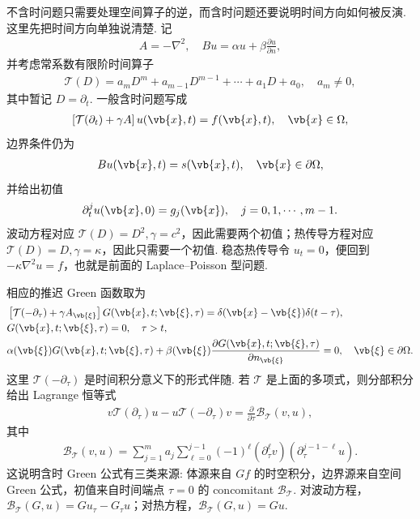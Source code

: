 不含时问题只需要处理空间算子的逆，而含时问题还要说明时间方向如何被反演. 这里先把时间方向单独说清楚. 记
\begin{align*}
	A=-\nabla^2,
	\quad
	B u=\alpha u+\beta\frac{\partial u}{\partial n},
\end{align*}
并考虑常系数有限阶时间算子
\begin{align*}
	\mathcal{T}(D)=a_mD^m+a_{m-1}D^{m-1}+\cdots+a_1D+a_0,
	\quad a_m\neq0,
\end{align*}
其中暂记 $D=\partial_t$. 一般含时问题写成
\begin{align*}
	\left[\mathcal{T}(\partial_t)+\gamma A\right]u(\vb{x},t)=f(\vb{x},t),
	\quad \vb{x}\in\Omega,
\end{align*}
边界条件仍为
\begin{align*}
	Bu(\vb{x},t)=s(\vb{x},t),
	\quad \vb{x}\in\partial\Omega,
\end{align*}
并给出初值
\begin{align*}
	\partial_t^j u(\vb{x},0)=g_j(\vb{x}),
	\quad j=0,1,\cdots,m-1.
\end{align*}
波动方程对应 $\mathcal{T}(D)=D^2,\gamma=c^2$，因此需要两个初值；热传导方程对应 $\mathcal{T}(D)=D,\gamma=\kappa$，因此只需要一个初值. 稳态热传导令 $u_t=0$，便回到 $-\kappa\nabla^2u=f$，也就是前面的 Laplace--Poisson 型问题.

相应的推迟 Green 函数取为
\begin{align*}
	&\left[\mathcal{T}(-\partial_\tau)+\gamma A_{\vb{\xi}}\right]
	G(\vb{x},t;\vb{\xi},\tau)
	=\delta(\vb{x}-\vb{\xi})\delta(t-\tau),\\
	&G(\vb{x},t;\vb{\xi},\tau)=0,
	\quad \tau>t,\\
	&\alpha(\vb{\xi})G(\vb{x},t;\vb{\xi},\tau)
	+\beta(\vb{\xi})\frac{\partial G(\vb{x},t;\vb{\xi},\tau)}{\partial n_{\vb{\xi}}}=0,
	\quad \vb{\xi}\in\partial\Omega.
\end{align*}
这里 $\mathcal{T}(-\partial_\tau)$ 是时间积分意义下的形式伴随. 若 $\mathcal{T}$ 是上面的多项式，则分部积分给出 Lagrange 恒等式
\begin{align*}
	v\mathcal{T}(\partial_\tau)u-u\mathcal{T}(-\partial_\tau)v
	=\frac{\partial}{\partial\tau}\mathcal{B}_{\mathcal{T}}(v,u),
\end{align*}
其中
\begin{align*}
	\mathcal{B}_{\mathcal{T}}(v,u)
	=\sum_{j=1}^m a_j\sum_{\ell=0}^{j-1}(-1)^\ell
	(\partial_\tau^\ell v)(\partial_\tau^{j-1-\ell}u).
\end{align*}
这说明含时 Green 公式有三类来源: 体源来自 $Gf$ 的时空积分，边界源来自空间 Green 公式，初值来自时间端点 $\tau=0$ 的 concomitant $\mathcal{B}_{\mathcal{T}}$. 对波动方程，$\mathcal{B}_{\mathcal{T}}(G,u)=Gu_\tau-G_\tau u$；对热方程，$\mathcal{B}_{\mathcal{T}}(G,u)=Gu$.

